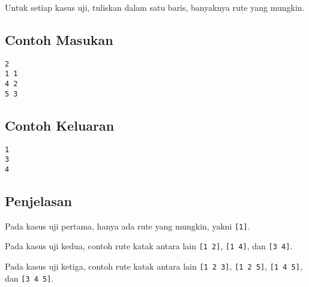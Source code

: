 \documentclass{article}
\begin{document}
Untuk setiap kasus uji, tuliskan dalam satu baris, banyaknya rute yang mungkin.

\begin{multicols}{2}
\subsection*{Contoh Masukan}
\begin{lstlisting}
2
1 1
4 2
5 3
\end{lstlisting}
\columnbreak
\subsection*{Contoh Keluaran}
\begin{lstlisting}
1
3
4
\end{lstlisting}
\vfill
\null
\end{multicols}

\subsection*{Penjelasan}

Pada kasus uji pertama, hanya ada rute yang mungkin, yakni \lstinline{[1]}.

Pada kasus uji kedua, contoh rute katak antara lain \lstinline{[1 2]}, \lstinline{[1 4]}, dan \lstinline{[3 4]}.

Pada kasus uji ketiga, contoh rute katak antara lain \lstinline{[1 2 3]}, \lstinline{[1 2 5]}, \lstinline{[1 4 5]}, dan \lstinline{[3 4 5]}.

\pagebreak
\end{document}
